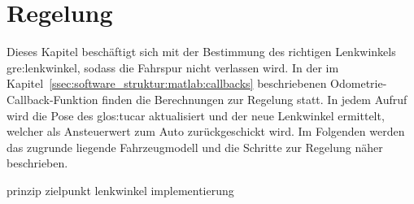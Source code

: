 \chapter{Regelung \dcfirstauthorshort}
\label{cha:regelung}

Dieses Kapitel beschäftigt sich mit der Bestimmung des richtigen Lenkwinkels \gls{gre:lenkwinkel}, sodass die Fahrspur nicht verlassen wird. In der im Kapitel~\ref{ssec:software_struktur:matlab:callbacks} beschriebenen Odometrie-Callback-Funktion finden die Berechnungen zur Regelung statt. In jedem Aufruf wird die Pose des \gls{glos:tucar} aktualisiert und der neue Lenkwinkel ermittelt, welcher als Ansteuerwert zum Auto zurückgeschickt wird. Im Folgenden werden das zugrunde liegende Fahrzeugmodell und die Schritte zur Regelung näher beschrieben. 

{prinzip}
{zielpunkt}
{lenkwinkel}
{implementierung}

